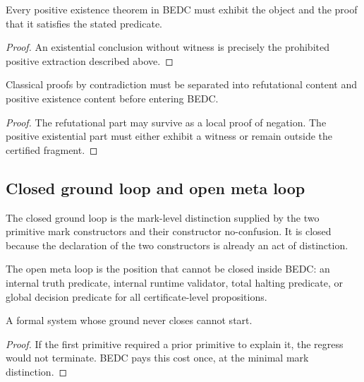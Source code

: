 \begin{corollary}
\label{cor:philosophy-existence-requires-witness}
Every positive existence theorem in BEDC must exhibit the object and
the proof that it satisfies the stated predicate.
\end{corollary}
\begin{proof}
An existential conclusion without witness is precisely the prohibited
positive extraction described above.
\end{proof}

\begin{corollary}
\label{cor:philosophy-classical-contradiction-audited}
Classical proofs by contradiction must be separated into refutational
content and positive existence content before entering BEDC.
\end{corollary}
\begin{proof}
The refutational part may survive as a local proof of negation. The
positive existential part must either exhibit a witness or remain
outside the certified fragment.
\end{proof}

\subsection{Closed ground loop and open meta loop}
\label{subsec:philosophy-ground-meta-loop}

\begin{definition}
\label{def:philosophy-closed-ground-loop}
The closed ground loop is the mark-level distinction supplied by the
two primitive mark constructors and their constructor no-confusion. It
is closed because the declaration of the two constructors is already an
act of distinction.
\end{definition}

\begin{definition}
\label{def:philosophy-open-meta-loop}
The open meta loop is the position that cannot be closed inside BEDC:
an internal truth predicate, internal runtime validator, total halting
predicate, or global decision predicate for all certificate-level
propositions.
\end{definition}

\begin{theorem}
\label{thm:philosophy-ground-must-close}
A formal system whose ground never closes cannot start.
\end{theorem}
\begin{proof}
If the first primitive required a prior primitive to explain it, the
regress would not terminate. BEDC pays this cost once, at the minimal
mark distinction.
\end{proof}

